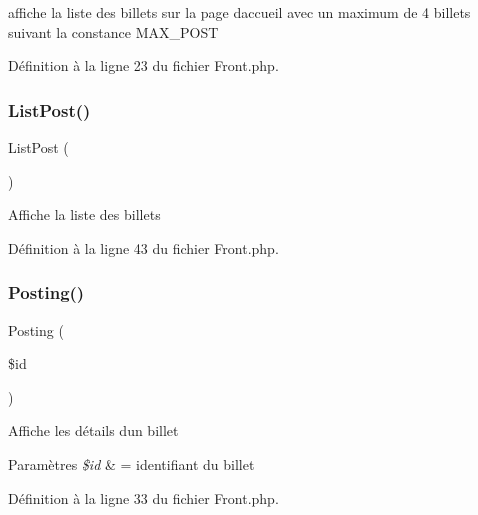 affiche la liste des billets sur la page d\textquotesingle{}accueil avec un maximum de 4 billets suivant la constance M\+A\+X\+\_\+\+P\+O\+ST 

Définition à la ligne 23 du fichier Front.\+php.

\mbox{\label{class_src_1_1_controllers_1_1_front_a8ce0a92892ab19020f1ebefe99d88a00}} 
\subsubsection{\texorpdfstring{List\+Post()}{ListPost()}}
{\footnotesize\ttfamily List\+Post (\begin{DoxyParamCaption}{ }\end{DoxyParamCaption})}

Affiche la liste des billets 

Définition à la ligne 43 du fichier Front.\+php.

\mbox{\label{class_src_1_1_controllers_1_1_front_a5fcbe325afb03acc6e4eaec38a7bb1ae}} 
\subsubsection{\texorpdfstring{Posting()}{Posting()}}
{\footnotesize\ttfamily Posting (\begin{DoxyParamCaption}\item[{}]{\$id }\end{DoxyParamCaption})}

Affiche les détails d\textquotesingle{}un billet 
\begin{DoxyParams}{Paramètres}
{\em \$id} & = identifiant du billet \\
\hline
\end{DoxyParams}


Définition à la ligne 33 du fichier Front.\+php.

\mbox{\label{class_src_1_1_controllers_1_1_front_a8b22c40bd1737bbb7db0816b7e9763b3}} 
